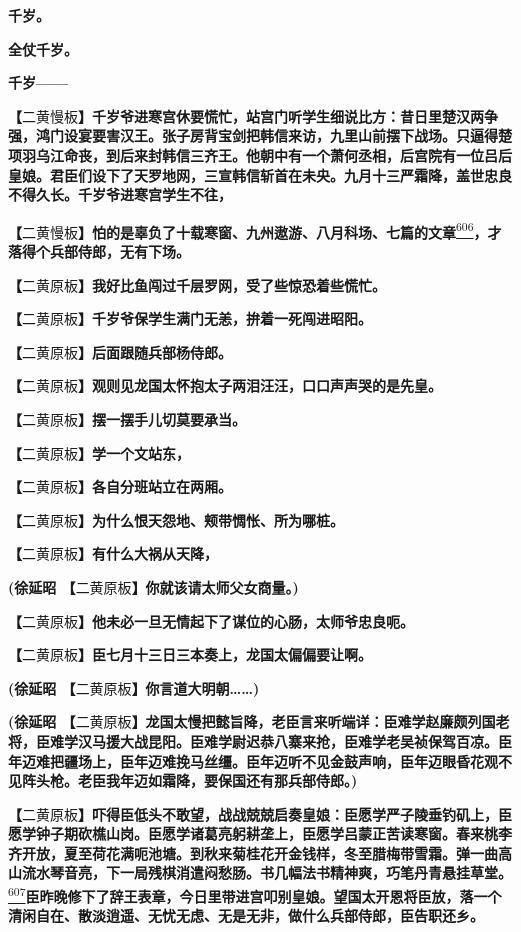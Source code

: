 \textbf{千岁。}

\textbf{全仗千岁。}

\textbf{千岁------}

\textbf{【}二黄慢板\textbf{】千岁爷进寒宫休要慌忙，站宫门听学生细说比方：昔日里楚汉两争强，鸿门设宴要害汉王。张子房背宝剑把韩信来访，九里山前摆下战场。只逼得楚项羽乌江命丧，到后来封韩信三齐王。他朝中有一个萧何丞相，后宫院有一位吕后皇娘。君臣们设下了天罗地网，三宣韩信斩首在未央。九月十三严霜降，盖世忠良不得久长。千岁爷进寒宫学生不往，}

\textbf{【}二黄慢板\textbf{】怕的是辜负了十载寒窗、九州遨游、八月科场、七篇的文章}\protect\hyperlink{fn606}{\textsuperscript{606}}\textbf{，才落得个兵部侍郎，无有下场。}

\textbf{【}二黄原板\textbf{】我好比鱼闯过千层罗网，受了些惊恐着些慌忙。}

\textbf{【}二黄原板\textbf{】千岁爷保学生满门无恙，拚着一死闯进昭阳。}

\textbf{【}二黄原板\textbf{】后面跟随兵部杨侍郎。}

\textbf{【}二黄原板\textbf{】观则见龙国太怀抱太子两泪汪汪，口口声声哭的是先皇。}

\textbf{【}二黄原板\textbf{】摆一摆手儿切莫要承当。}

\textbf{【}二黄原板\textbf{】学一个文站东，}

\textbf{【}二黄原板\textbf{】各自分班站立在两厢。}

\textbf{【}二黄原板\textbf{】为什么恨天怨地、颊带惆怅、所为哪桩。}

\textbf{【}二黄原板\textbf{】有什么大祸从天降，}

\textbf{(徐延昭 【}二黄原板\textbf{】你就该请太师父女商量。)}

\textbf{【}二黄原板\textbf{】他未必一旦无情起下了谋位的心肠，太师爷忠良呃。}

\textbf{【}二黄原板\textbf{】臣七月十三日三本奏上，龙国太偏偏要让啊。}

\textbf{(徐延昭 【}二黄原板\textbf{】你言道大明朝\ldots{}\ldots{})}

\textbf{(徐延昭
【}二黄原板\textbf{】龙国太慢把懿旨降，老臣言来听端详：臣难学赵廉颇列国老将，臣难学汉马援大战昆阳。臣难学尉迟恭八寨来抢，臣难学老吴祯保驾百凉。臣年迈难把疆场上，臣年迈难挽马丝缰。臣年迈听不见金鼓声响，臣年迈眼昏花观不见阵头枪。老臣我年迈如霜降，要保国还有那兵部侍郎。)}

\textbf{【}二黄原板\textbf{】吓得臣低头不敢望，战战兢兢启奏皇娘：臣愿学严子陵垂钓矶上，臣愿学钟子期砍樵山岗。臣愿学诸葛亮躬耕垄上，臣愿学吕蒙正苦读寒窗。春来桃李齐开放，夏至荷花满呃池塘。到秋来菊桂花开金钱样，冬至腊梅带雪霜。弹一曲高山流水琴音亮，下一局残棋消遣闷愁肠。书几幅法书精神爽，巧笔丹青悬挂草堂。}\protect\hyperlink{fn607}{\textsuperscript{607}}\textbf{臣昨晚修下了辞王表章，今日里带进宫叩别皇娘。望国太开恩将臣放，落一个清闲自在、散淡逍遥、无忧无虑、无是无非，做什么兵部侍郎，臣告职还乡。}

